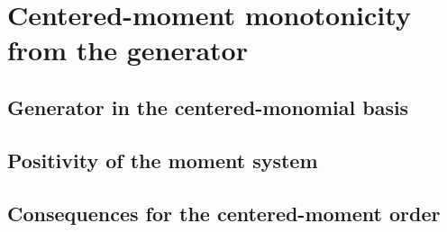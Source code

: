 \section{Centered-moment monotonicity from the generator}
\label{sec:moment-order}

\subsection{Generator in the centered-monomial basis}

\subsection{Positivity of the moment system}

\subsection{Consequences for the centered-moment order}
